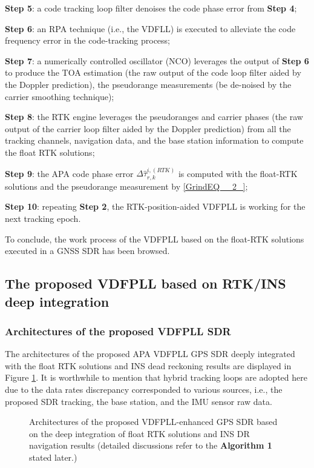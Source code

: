 \documentclass{article}
\newcommand{\reffig}[1]{Figure \ref{#1}}
\begin{document}
\textbf{Step 5}: a code tracking loop filter denoises the code phase error from \textbf{Step 4};

\textbf{Step 6}: an RPA technique (i.e., the VDFLL) is executed to alleviate the code frequency error in the code-tracking process; 

\textbf{Step 7}: a numerically controlled oscillator (NCO) leverages the output of \textbf{Step 6} to produce the TOA estimation (the raw output of the code loop filter aided by the Doppler prediction), the pseudorange measurements (be de-noised by the carrier smoothing technique);

\textbf{Step 8}: the RTK engine leverages the pseudoranges and carrier phases (the raw output of the carrier loop filter aided by the Doppler prediction) from all the tracking channels, navigation data, and the base station information to compute the float RTK solutions; 

\textbf{Step 9}: the APA code phase error $\Delta{\hat{\tau}}^{i,\left(RTK\right)}_{r,k}$ is computed with the float-RTK solutions and the pseudorange measurement by \eqref{GrindEQ__2_}; 

\textbf{Step 10}: repeating \textbf{Step 2}, the RTK-position-aided VDFPLL is working for the next tracking epoch. 

To conclude, the work process of the VDFPLL based on the float-RTK solutions executed in a GNSS SDR has been browsed.

\subsection{The proposed VDFPLL based on RTK/INS deep integration}

\subsubsection{Architectures of the proposed VDFPLL SDR}
The architectures of the proposed APA VDFPLL GPS SDR deeply integrated with the float RTK solutions and INS dead reckoning results are displayed in \reffig{fig:fig4}. It is worthwhile to mention that hybrid tracking loops are adopted here due to the data rates discrepancy corresponded to various sources, i.e., the proposed SDR tracking, the base station, and the IMU sensor raw data. 


\begin{figure}[htbp]%
\centering
{}
\hfil
{}
\hfil
{}
\caption{Architectures of the proposed VDFPLL-enhanced GPS SDR based on the deep integration of float RTK solutions and INS DR navigation results (detailed discussions refer to the \textbf{Algorithm 1} stated later.)}%
\label{fig:fig4}%
\end{figure} 
\end{document}
